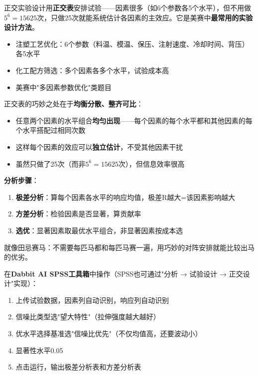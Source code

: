 
\begin{algointro}
正交实验设计用\textbf{正交表}安排试验——因素很多（如6个参数各5个水平），但不用做$5^6=15625$次，只做25次就能系统估计各因素的主效应。它是美赛中\textbf{最常用的实验设计方法}。
\end{algointro}

\begin{algoscene}
\begin{itemize}
    \item 注塑工艺优化：6个参数（料温、模温、保压、注射速度、冷却时间、背压）各5水平
    \item 化工配方筛选：多个因素各多个水平，试验成本高
    \item 美赛中"多因素参数优化"类题目
\end{itemize}
\end{algoscene}

\begin{algoprinciple}
正交表的巧妙之处在于\textbf{均衡分散、整齐可比}：

\begin{itemize}
    \item 任意两个因素的水平组合\textbf{均匀出现}——每个因素的每个水平都和其他因素的每个水平搭配过相同次数
    \item 这样每个因素的效应可以\textbf{独立估计}，不受其他因素干扰
    \item 虽然只做了25次（而非$5^6=15625$次），但信息效率很高
\end{itemize}

\textbf{分析步骤}：
\begin{enumerate}
    \item \textbf{极差分析}：算每个因素各水平的响应均值，极差R越大=该因素影响越大
    \item \textbf{方差分析}：检验因素是否显著，算贡献率
    \item \textbf{选优}：显著因素取最优水平组合，非显著因素按成本选
\end{enumerate}

就像田忌赛马：不需要每匹马都和每匹马赛一遍，用巧妙的对阵安排就能比较出马的优劣。
\end{algoprinciple}

\begin{algosposs}
在\textbf{Dabbit AI SPSS工具箱}中操作（SPSS也可通过"分析 → 试验设计 → 正交设计"实现）：

\begin{enumerate}
    \item 上传试验数据，因素列自动识别，响应列自动识别
    \item 信噪比类型选"望大特性"（拉伸强度越大越好）
    \item 优水平选择基准选"信噪比优先"（不仅均值高，还要波动小）
    \item 显著性水平0.05
    \item 点击运行，输出极差分析表和方差分析表
\end{enumerate}
\end{algosposs}

